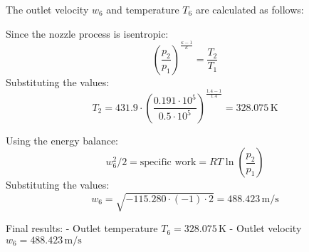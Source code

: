 The outlet velocity \( w_6 \) and temperature \( T_6 \) are calculated as follows:  

Since the nozzle process is isentropic:  
\[
\left( \frac{p_2}{p_1} \right)^{\frac{\kappa - 1}{\kappa}} = \frac{T_2}{T_1}
\]  
Substituting the values:  
\[
T_2 = 431.9 \cdot \left( \frac{0.191 \cdot 10^5}{0.5 \cdot 10^5} \right)^{\frac{1.4 - 1}{1.4}} = 328.075 \, \text{K}
\]  

Using the energy balance:  
\[
w_6^2 / 2 = \text{specific work} = R T \ln \left( \frac{p_2}{p_1} \right)
\]  
Substituting the values:  
\[
w_6 = \sqrt{-115.280 \cdot (-1) \cdot 2} = 488.423 \, \text{m/s}
\]  

Final results:  
- Outlet temperature \( T_6 = 328.075 \, \text{K} \)  
- Outlet velocity \( w_6 = 488.423 \, \text{m/s} \)